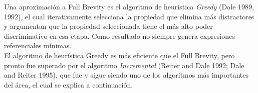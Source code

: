 Una aproximaci\'on a Full Brevity es el algoritmo de heur\'istica {\it Greedy} (Dale  1989, 1992), el cual iterativamente selecciona la propiedad que elimina m\'as distractores y argumentan que la propiedad seleccionada tiene el m\'as alto poder discriminativo en esa etapa. Como resultado no siempre genera expresiones referenciales m\'inimas.\\
El algoritmo de heur\'istica Greedy es m\'as eficiente que el Full Brevity, pero pronto fue superado por el algoritmo {\it Incremental} (Reiter  and  Dale  1992;  Dale  and  Reiter  1995), que fue y sigue siendo uno de los algoritmos m\'as importantes del \'area, el cual se explica a continuaci\'on. 




